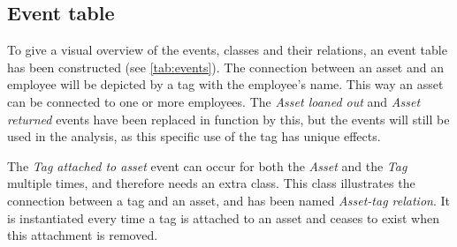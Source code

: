 \subsection{Event table}\label{ssc:eventtable}
To give a visual overview of the events, classes and their relations, an event table has been constructed (see \autoref{tab:events}). The connection between an asset and an employee will be depicted by a tag with the employee's name. This way an asset can be connected to one or more employees. The  \textit{Asset loaned out} and \textit{Asset returned} events have been replaced in function by this, but the events will still be used in the analysis, as this specific use of the tag has unique effects.
\par
The \textit{Tag attached to asset} event can occur for both the \textit{Asset} and the \textit{Tag} multiple times, and therefore needs an extra class. This class illustrates the connection between a tag and an asset, and has been named \textit{Asset-tag relation}. It is instantiated every time a tag is attached to an asset and ceases to exist when this attachment is removed.

